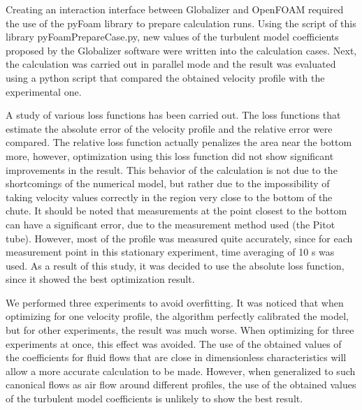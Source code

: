 \documentclass[mathematics,article,accept,pdftex,moreauthors]{Definitions/mdpi}
\begin{document}
Creating an interaction interface between Globalizer and OpenFOAM required the use of the pyFoam library to prepare calculation runs. Using the script of this library pyFoamPrepareCase.py, new values of the turbulent model coefficients proposed by the Globalizer software were written into the calculation cases. Next, the calculation was carried out in parallel mode and the result was evaluated using a python script that compared the obtained velocity profile with the experimental one.

A study of various loss functions has been carried out. The loss functions that estimate the absolute error of the velocity profile and the relative error were compared. The relative loss function actually penalizes the area near the bottom more, however, optimization using this loss function did not show significant improvements in the result. This behavior of the calculation is not due to the shortcomings of the numerical model, but rather due to the impossibility of taking velocity values correctly in the region very close to the bottom of the chute. It should be noted that measurements at the point closest to the bottom can have a significant error, due to the measurement method used (the Pitot tube). However, most of the profile was measured quite accurately, since for each measurement point in this stationary experiment, time averaging of 10 s was used. As a result of this study, it was decided to use the absolute loss function, since it showed the best optimization result.

We performed three experiments to avoid overfitting. It was noticed that when optimizing for one velocity profile, the algorithm perfectly calibrated the model, but for other experiments, the result was much worse. When optimizing for three experiments at once, this effect was avoided. The use of the obtained values of the coefficients for fluid flows that are close in dimensionless characteristics will allow a more accurate calculation to be made. However, when generalized to such canonical flows as air flow around different profiles, the use of the obtained values of the turbulent model coefficients is unlikely to show the best result.
\end{document}
